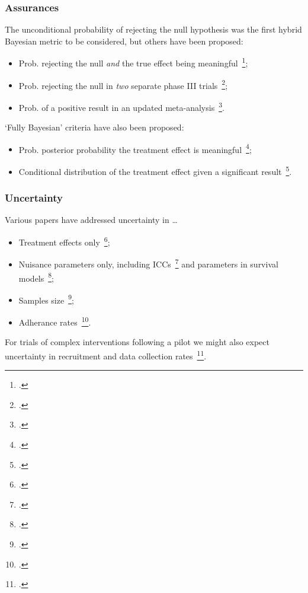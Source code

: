 \documentclass{beamer}
\begin{document}
\begin{frame}
\frametitle{Assurances}
The unconditional probability of rejecting the null hypothesis was the first hybrid Bayesian metric to be considered, but others have been proposed:
\begin{itemize}
\item Prob. rejecting the null \emph{and} the true effect being meaningful~\footcite{OHagan2005};
\item Prob. rejecting the null in \emph{two} separate phase III trials~\footcite{Zhang2013};
\item Prob. of a positive result in an updated meta-analysis~\footcite{Sutton2007}.
\end{itemize}
`Fully Bayesian' criteria have also been proposed:
\begin{itemize}
\item Prob. posterior probability the treatment effect is meaningful~\footcite{Ibrahim2014};
\item Conditional distribution of the treatment effect given a significant result~\footcite{Walley2015}.
\end{itemize}
\end{frame}


\begin{frame}
\frametitle{Uncertainty}
Various papers have addressed uncertainty in \ldots
\begin{itemize}
\item Treatment effects only~\footcite{OHagan2005};
\item Nuisance parameters only, including ICCs~\footcite{Turner2004} and parameters in survival models~\footcite{Ren2013};
\item Samples size~\footcite{Ambrosius2010};
\item Adherance rates~\footcite{Fay2006}.
\end{itemize}
For trials of complex interventions following a pilot we might also expect uncertainty in recruitment and data collection rates~\footcite{Avery2017}.
\end{frame}

\end{document}
